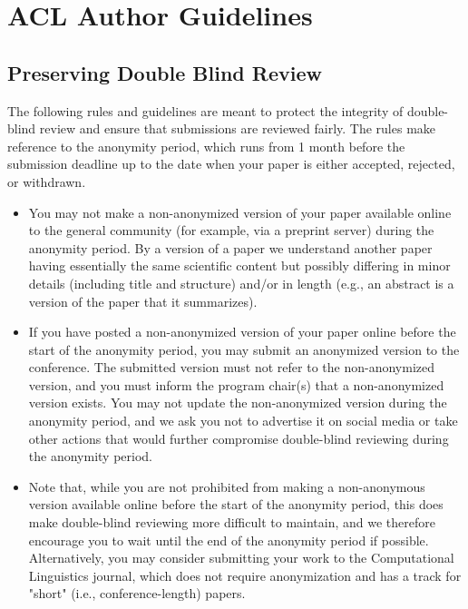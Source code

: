 \chapter{ACL Author Guidelines}
\thispagestyle{emptyheader}

\section*{Preserving Double Blind Review}\vspace{2em}

The following rules and guidelines are meant to protect the integrity of double-blind review and ensure that submissions are reviewed fairly. The rules make reference to the anonymity period, which runs from 1 month before the submission deadline up to the date when your paper is either accepted, rejected, or withdrawn.

\begin{itemize}

    \item You may not make a non-anonymized version of your paper available online to the general community (for example, via a preprint server) during the anonymity period. By a version of a paper we understand another paper having essentially the same scientific content but possibly differing in minor details (including title and structure) and/or in length (e.g., an abstract is a version of the paper that it summarizes).
    \item If you have posted a non-anonymized version of your paper online before the start of the anonymity period, you may submit an anonymized version to the conference. The submitted version must not refer to the non-anonymized version, and you must inform the program chair(s) that a non-anonymized version exists. You may not update the non-anonymized version during the anonymity period, and we ask you not to advertise it on social media or take other actions that would further compromise double-blind reviewing during the anonymity period.
    \item Note that, while you are not prohibited from making a non-anonymous version available online before the start of the anonymity period, this does make double-blind reviewing more difficult to maintain, and we therefore encourage you to wait until the end of the anonymity period if possible. Alternatively, you may consider submitting your work to the Computational Linguistics journal, which does not require anonymization and has a track for "short" (i.e., conference-length) papers.

\end{itemize}

